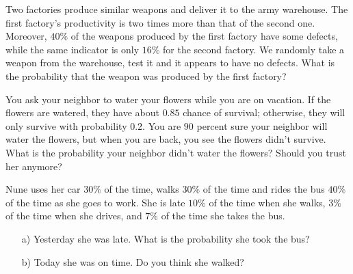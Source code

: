 

\begin{problem}
Two factories produce similar weapons and deliver it to the army warehouse. The first factory’s productivity is two times more than that of
the second one. Moreover, $40\%$ of the weapons produced by the first
factory have some defects, while the same indicator is only $16\%$ for
the second factory. We randomly take a weapon from the warehouse,
test it and it appears to have no defects. What is the probability that
the weapon was produced by the first factory?
\end{problem}
\medskip


\begin{problem}%
You ask your neighbor to water your flowers while you are on vacation. If the flowers are watered, they have about $0.85$ chance of survival; otherwise, they will only survive with probability $0.2$. You are $90$ percent sure your neighbor will water the flowers, but when you are back, you see the flowers didn't survive. What is the probability your neighbor didn't water the flowers? Should you trust her anymore? 
\end{problem}
\medskip

\begin{problem}
Nune uses her car $30\%$ of the time, walks $30\%$ of the time and rides the bus $40\%$ of the time as she goes to work. She is late $10\%$ of the time when she walks, $3\%$ of the time when she drives, and $7\%$ of the time she takes the bus.

\begin{enumerate}
\item[a) ] Yesterday she was late. What is the probability she took the bus?

\item[b) ] Today she was on time. Do you think she walked?
\end{enumerate}
\end{problem}
\medskip


